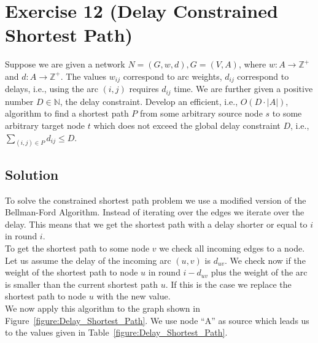 \documentclass[a4paper, 12pt]{report}
\begin{document}
\section{Exercise 12 (Delay Constrained Shortest Path)}

Suppose we are given a network $N=(G,w,d), G=(V,A)$, where $w:A→ℤ^+$ and
$d:A→ℤ^+$. The values $w_{ij}$ correspond to arc weights, $d_{ij}$ correspond
to delays, i.e., using the arc $(i,j)$ requires $d_{ij}$ time. We are further
given a positive number $D ∈ ℕ$, the delay constraint. Develop an
efficient, i.e., $O(D · |A|)$, algorithm to find a shortest path $P$ from some
arbitrary source node $s$ to some arbitrary target node $t$ which does not
exceed the global delay constraint $D$, i.e., $∑_{(i,j) ∈ P} d_{ij} ≤ D$.

\subsection{Solution}

To solve the constrained shortest path problem we use a modified version of the
Bellman-Ford Algorithm. Instead of iterating over the edges we iterate over the
delay. This means that we get the shortest path with a delay shorter or equal
to $i$ in round $i$.\\

To get the shortest path to some node $v$ we check all incoming edges to a
node. Let us assume the delay of the incoming arc $(u,v)$ is $d_{uv}$. We check
now if the weight of the shortest path to node $u$ in round $i-d_{uv}$ plus the
weight of the arc is smaller than the current shortest path $u$. If this is the
case we replace the shortest path to node $u$ with the new value.\\

We now apply this algorithm to the graph shown in
Figure~\ref{figure:Delay_Shortest_Path}. We use node “A” as source which leads us to the values given in Table~\ref{figure:Delay_Shortest_Path}.\\
\end{document}
